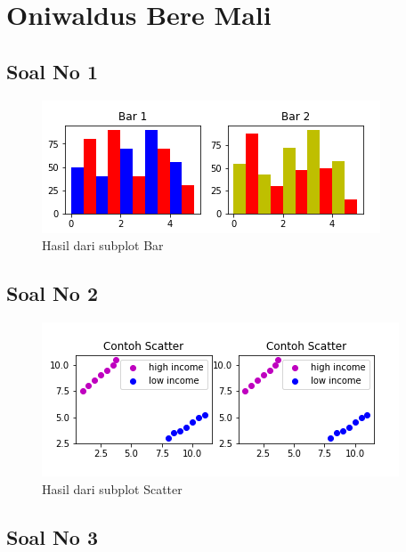 \section{Oniwaldus Bere Mali}
\subsection{Soal No 1}



\begin{figure}[h]
\centering
\includegraphics[scale=0.9]{figures/6/Praktek/1174005/bar.png}
\caption{Hasil dari subplot Bar}
\label{fig:contoh}
\end{figure}

\subsection{Soal No 2}



\begin{figure}[h]
\centering
\includegraphics[scale=0.9]{figures/6/Praktek/1174005/scatter.png}
\caption{Hasil dari subplot Scatter}
\label{fig:contoh}
\end{figure}

\subsection{Soal No 3}

